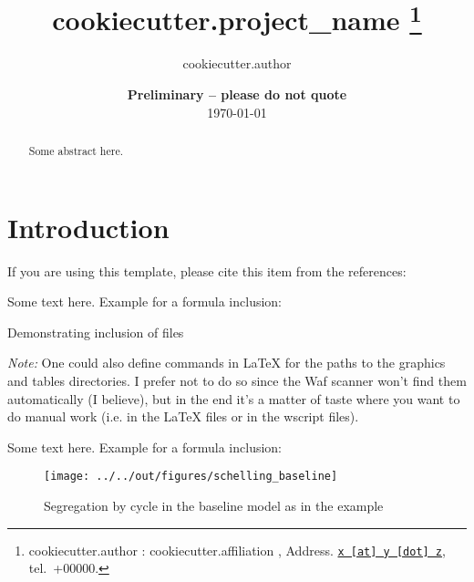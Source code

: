 \documentclass[11pt, a4paper, leqno]{article}
\begin{document}
\title{%
{{ cookiecutter.project_name }}
\thanks{%
{{ cookiecutter.author }}: {{ cookiecutter.affiliation }}, Address. \href{mailto:{{ cookiecutter.email }}}{\nolinkurl{x [at] y [dot] z}}, tel.~+00000.}
}

\author{%
{{ cookiecutter.author }}
}

\date{
{\bf Preliminary -- please do not quote} 
\\[1ex] 
\today
}

\maketitle


\begin{abstract}
	Some abstract here.
\end{abstract}
\clearpage

\section{Introduction} %
\label{sec:introduction}

If you are using this template, please cite this item from the references: \citet{GaudeckerEconProjectTemplates}

Some text here. Example for a formula inclusion:



\begin{table}[h!]
    \caption{Demonstrating inclusion of files}
    \label{tab:demonstrating_inclusion_of_files}
    \begin{center}
        
    \end{center}
    \footnotesize
    \emph{Note:} One could also define commands in {\LaTeX} for the paths to the graphics and tables directories. I prefer not to do so since the Waf scanner won't find them automatically (I believe), but in the end it's a matter of taste where you want to do manual work (i.e. in the {\LaTeX} files or in the wscript files).
\end{table}


Some text here. Example for a formula inclusion:

\begin{figure}
    \caption{Segregation by cycle in the baseline \citet{Schelling69} model as in the \citet{StachurskiSargent13} example}
    
    \texttt{[image: ../../out/figures/schelling\_baseline]}

\end{figure}
\end{document}
